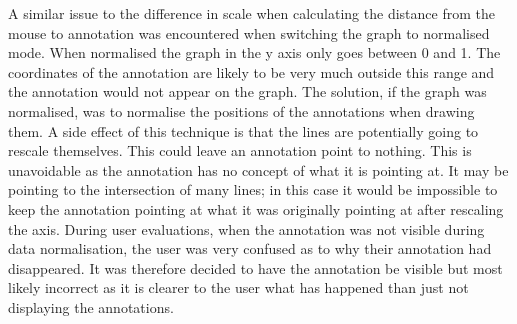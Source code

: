 A similar issue to the difference in scale when calculating the distance from the mouse to annotation was encountered when switching the graph to normalised mode.  When normalised the graph in the y axis only goes between 0 and 1.  The coordinates of the annotation are likely to be very much outside this range and the annotation would not appear on the graph.  The solution, if the graph was normalised, was to normalise the positions of the annotations when drawing them.  A side effect of this technique is that the lines are potentially going to rescale themselves.  This could leave an annotation point to nothing.  This is unavoidable as the annotation has no concept of what it is pointing at.  It may be pointing to the intersection of many lines; in this case it would be impossible to keep the annotation pointing at what it was originally pointing at after rescaling the axis.  During user evaluations, when the annotation was not visible during data normalisation, the user was very confused as to why their annotation had disappeared.  It was therefore decided to have the annotation be visible but most likely incorrect as it is clearer to the user what has happened than just not displaying the annotations.

